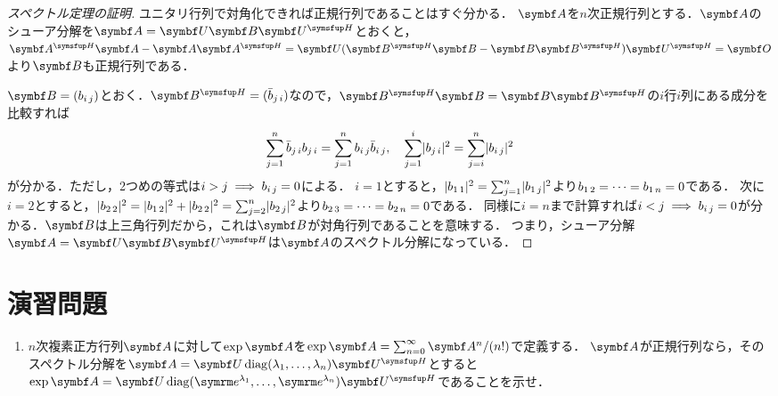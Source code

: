 \documentclass[../../main]{subfiles}
\begin{document}
\begin{proof}[スペクトル定理の証明]
  ユニタリ行列で対角化できれば正規行列であることはすぐ分かる．
  \(\mat{A}\)を\(n\)次正規行列とする．\(\mat{A}\)のシューア分解を\(\mat{A}=\mat{U}\mat{B}\htrps{\mat{U}}\)とおくと，
  \(\htrps{\mat{A}}\mat{A}-\mat{A}\htrps{\mat{A}}=\mat{U}(\htrps{\mat{B}}\mat{B}-\mat{B}\htrps{\mat{B}})\htrps{\mat{U}}=\zmat\)より\(\mat{B}\)も正規行列である．

  \(\mat{B}=\matfence{\midx{b}{i}{j}}\)とおく．\(\htrps{\mat{B}}=\matfence{\midx{\conj{b}}{j}{i}}\)なので，\(\htrps{\mat{B}}\mat{B}=\mat{B}\htrps{\mat{B}}\)の\(i\)行\(i\)列にある成分を比較すれば
  \[
    \sum_{j=1}^n\midx{\conj{b}}{j}{i}\midx{b}{j}{i} = \sum_{j=1}^n\midx{b}{i}{j}\midx{\conj{b}}{i}{j},
    \quad\sum_{j=1}^i\abs{\midx{b}{j}{i}}^2 = \sum_{j=i}^n\abs{\midx{b}{i}{j}}^2
  \]
  が分かる．ただし，2つめの等式は\(i>j\implies b_{i\,j}=0\)による．
  \(i=1\)とすると，\(\lvert b_{1\,1}\rvert^2=\sum_{j=1}^n\lvert b_{1\,j}\rvert^2\)より\(b_{1\,2}=\dots=b_{1\,n}=0\)である．
  次に\(i=2\)とすると，\(\lvert b_{2\,2}\rvert^2=\lvert b_{1\,2}\rvert^2+\lvert b_{2\,2}\rvert^2=\sum_{j=2}^n\lvert b_{2\,j}\rvert^2\)より\(b_{2\,3}=\dots=b_{2\,n}=0\)である．
  同様に\(i=n\)まで計算すれば\(i<j\implies b_{i\,j}=0\)が分かる．\(\mat{B}\)は上三角行列だから，これは\(\mat{B}\)が対角行列であることを意味する．
  つまり，シューア分解\(\mat{A}=\mat{U}\mat{B}\htrps{\mat{U}}\)は\(\mat{A}\)のスペクトル分解になっている．
\end{proof}

\section{演習問題}

\begin{enumerate}
  \item \(n\)次複素正方行列\(\mat{A}\)に対して\(\exp\mat{A}\)を\(\exp\mat{A}=\sum_{n=0}^\infty\mat{A}^n/(n!)\)で定義する．
    \(\mat{A}\)が正規行列なら，そのスペクトル分解を\(\mat{A}=\mat{U}\diag(\lambda_1,\dots,\lambda_n)\htrps{\mat{U}}\)とすると
    \(\exp\mat{A}=\mat{U}\diag(\napr^{\lambda_1},\dots,\napr^{\lambda_n})\htrps{\mat{U}}\)であることを示せ．
\end{enumerate}
\end{document}
